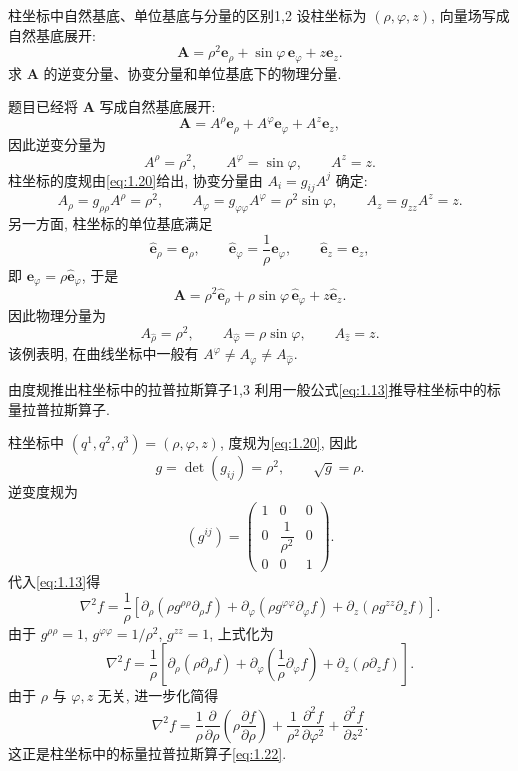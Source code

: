 \begin{example}{柱坐标中自然基底、单位基底与分量的区别}{1,2}
设柱坐标为 $(\rho,\varphi,z)$, 向量场写成自然基底展开: 
\[
\bm{A}
=
\rho^{2}\bm{e}_{\rho}
+
\sin{\varphi}\,\bm{e}_{\varphi}
+
z\bm{e}_{z}.
\]
求 $\bm{A}$ 的逆变分量、协变分量和单位基底下的物理分量. 

\begin{solution}
	题目已经将 $\bm{A}$ 写成自然基底展开: 
	\[
	\bm{A}
	=
	A^{\rho}\bm{e}_{\rho}
	+
	A^{\varphi}\bm{e}_{\varphi}
	+
	A^{z}\bm{e}_{z},
	\]
	因此逆变分量为
	\[
	A^{\rho}=\rho^{2},
	\qquad
	A^{\varphi}=\sin{\varphi},
	\qquad
	A^{z}=z.
	\]
	柱坐标的度规由\eqref{eq:1.20}给出, 协变分量由 $A_{i}=g_{ij}A^{j}$ 确定: 
	\[
	A_{\rho}=g_{\rho\rho}A^{\rho}=\rho^{2},
	\qquad
	A_{\varphi}=g_{\varphi\varphi}A^{\varphi}
	=
	\rho^{2}\sin{\varphi},
	\qquad
	A_{z}=g_{zz}A^{z}=z.
	\]
	另一方面, 柱坐标的单位基底满足
	\[
	\hat{\bm{e}}_{\rho}=\bm{e}_{\rho},
	\qquad
	\hat{\bm{e}}_{\varphi}=\frac{1}{\rho}\bm{e}_{\varphi},
	\qquad
	\hat{\bm{e}}_{z}=\bm{e}_{z},
	\]
	即 $\bm{e}_{\varphi}=\rho\hat{\bm{e}}_{\varphi}$, 于是
	\[
	\bm{A}
	=
	\rho^{2}\hat{\bm{e}}_{\rho}
	+
	\rho\sin{\varphi}\,\hat{\bm{e}}_{\varphi}
	+
	z\hat{\bm{e}}_{z}.
	\]
	因此物理分量为
	\[
	A_{\hat{\rho}}=\rho^{2},
	\qquad
	A_{\hat{\varphi}}=\rho\sin{\varphi},
	\qquad
	A_{\hat{z}}=z.
	\]
	该例表明, 在曲线坐标中一般有 $A^{\varphi}\neq A_{\varphi}\neq A_{\hat{\varphi}}$. 
\end{solution}
\end{example}

\begin{example}{由度规推出柱坐标中的拉普拉斯算子}{1,3}
利用一般公式\eqref{eq:1.13}推导柱坐标中的标量拉普拉斯算子. 
\begin{solution}
	柱坐标中 $(q^{1},q^{2},q^{3})=(\rho,\varphi,z)$, 度规为\eqref{eq:1.20}, 因此
	\[
	g=\det{(g_{ij})}=\rho^{2},
	\qquad
	\sqrt{g}=\rho.
	\]
	逆变度规为
	\[
	(g^{ij})
	=
	\begin{pmatrix}
		1&0&0\\
		0&\dfrac{1}{\rho^{2}}&0\\
		0&0&1
	\end{pmatrix}.
	\]
	代入\eqref{eq:1.13}得
	\[
	\nabla^{2} f
	=
	\frac{1}{\rho}
	\left[
	\partial_{\rho}
	\left(
	\rho g^{\rho\rho}\partial_{\rho} f
	\right)
	+
	\partial_{\varphi}
	\left(
	\rho g^{\varphi\varphi}\partial_{\varphi} f
	\right)
	+
	\partial_{z}
	\left(
	\rho g^{zz}\partial_{z} f
	\right)
	\right].
	\]
	由于 $g^{\rho\rho}=1$, $g^{\varphi\varphi}=1/\rho^{2}$, $g^{zz}=1$, 上式化为
	\[
	\nabla^{2} f
	=
	\frac{1}{\rho}
	\left[
	\partial_{\rho}
	\left(
	\rho\partial_{\rho} f
	\right)
	+
	\partial_{\varphi}
	\left(
	\frac{1}{\rho}\partial_{\varphi} f
	\right)
	+
	\partial_{z}
	\left(
	\rho\partial_{z} f
	\right)
	\right].
	\]
	由于 $\rho$ 与 $\varphi,z$ 无关, 进一步化简得
	\[
	\nabla^{2} f
	=
	\frac{1}{\rho}
	\frac{\partial}{\partial\rho}
	\left(
	\rho\frac{\partial f}{\partial\rho}
	\right)
	+
	\frac{1}{\rho^{2}}
	\frac{\partial^{2} f}{\partial\varphi^{2}}
	+
	\frac{\partial^{2} f}{\partial z^{2}}.
	\]
	这正是柱坐标中的标量拉普拉斯算子\eqref{eq:1.22}. 
\end{solution}
\end{example}


